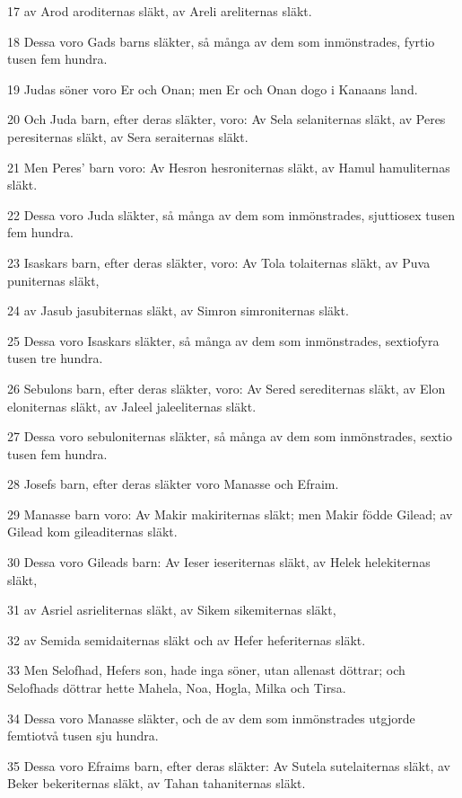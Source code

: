 \par 17 av Arod aroditernas släkt, av Areli areliternas släkt.
\par 18 Dessa voro Gads barns släkter, så många av dem som inmönstrades, fyrtio tusen fem hundra.
\par 19 Judas söner voro Er och Onan; men Er och Onan dogo i Kanaans land.
\par 20 Och Juda barn, efter deras släkter, voro: Av Sela selaniternas släkt, av Peres peresiternas släkt, av Sera seraiternas släkt.
\par 21 Men Peres' barn voro: Av Hesron hesroniternas släkt, av Hamul hamuliternas släkt.
\par 22 Dessa voro Juda släkter, så många av dem som inmönstrades, sjuttiosex tusen fem hundra.
\par 23 Isaskars barn, efter deras släkter, voro: Av Tola tolaiternas släkt, av Puva puniternas släkt,
\par 24 av Jasub jasubiternas släkt, av Simron simroniternas släkt.
\par 25 Dessa voro Isaskars släkter, så många av dem som inmönstrades, sextiofyra tusen tre hundra.
\par 26 Sebulons barn, efter deras släkter, voro: Av Sered serediternas släkt, av Elon eloniternas släkt, av Jaleel jaleeliternas släkt.
\par 27 Dessa voro sebuloniternas släkter, så många av dem som inmönstrades, sextio tusen fem hundra.
\par 28 Josefs barn, efter deras släkter voro Manasse och Efraim.
\par 29 Manasse barn voro: Av Makir makiriternas släkt; men Makir födde Gilead; av Gilead kom gileaditernas släkt.
\par 30 Dessa voro Gileads barn: Av Ieser ieseriternas släkt, av Helek helekiternas släkt,
\par 31 av Asriel asrieliternas släkt, av Sikem sikemiternas släkt,
\par 32 av Semida semidaiternas släkt och av Hefer heferiternas släkt.
\par 33 Men Selofhad, Hefers son, hade inga söner, utan allenast döttrar; och Selofhads döttrar hette Mahela, Noa, Hogla, Milka och Tirsa.
\par 34 Dessa voro Manasse släkter, och de av dem som inmönstrades utgjorde femtiotvå tusen sju hundra.
\par 35 Dessa voro Efraims barn, efter deras släkter: Av Sutela sutelaiternas släkt, av Beker bekeriternas släkt, av Tahan tahaniternas släkt.
